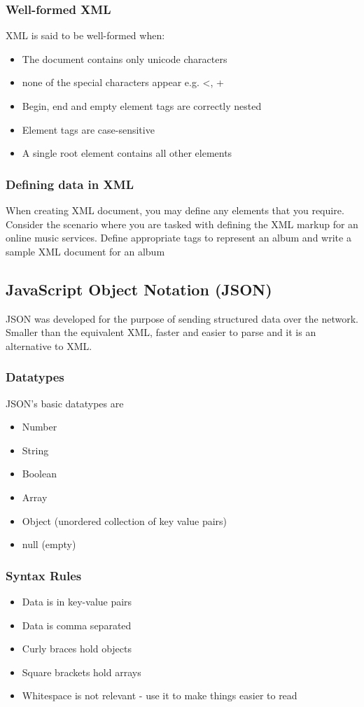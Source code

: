 \documentclass[a4paper]{article}
\theoremstyle{plain}
\theoremstyle{definition}
\theoremstyle{remark}
\begin{document}
\begin{flushleft}
\subsubsection{Well-formed XML}
XML is said to be well-formed when:
\begin{itemize}
	\item The document contains only unicode characters
	\item none of the special characters appear e.g. <, +
	\item Begin, end and empty element tags are correctly nested
	\item Element tags are case-sensitive
	\item A single root element contains all other elements
\end{itemize}
\subsubsection{Defining data in XML}
When creating XML document, you may define any elements that you require. Consider the scenario where you are tasked with defining the XML markup for an online music services. Define appropriate tags to represent an album and write a sample XML document for an album
\subsection{JavaScript Object Notation (JSON)}
JSON was developed for the purpose of sending structured data over the network. Smaller than the equivalent XML, faster and easier to parse and it is an alternative to XML.
\subsubsection{Datatypes}
JSON's basic datatypes are
\begin{itemize}
	\item Number
	\item String
	\item Boolean
	\item Array
	\item Object (unordered collection of key value pairs)
	\item null (empty)
\end{itemize}
\subsubsection{Syntax Rules}
\begin{itemize}
	\item Data is in key-value pairs
	\item Data is comma separated
	\item Curly braces hold objects
	\item Square brackets hold arrays
	\item Whitespace is not relevant - use it to make things easier to read
\end{itemize}

\end{flushleft}
\end{document}
